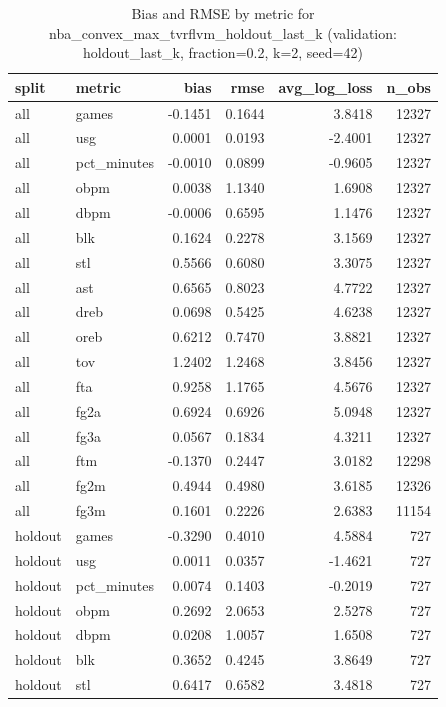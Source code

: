 \begin{table}
\caption{Bias and RMSE by metric for nba_convex_max_tvrflvm_holdout_last_k (validation: holdout_last_k, fraction=0.2, k=2, seed=42)}
\label{tab:nba_convex_max_tvrflvm_holdout_last_k_vs_holdout_last_k_f20_k2_s42_bias_rmse}
\begin{tabular}{llrrrr}
\toprule
split & metric & bias & rmse & avg\_log\_loss & n\_obs \\
\midrule
all & games & -0.1451 & 0.1644 & 3.8418 & 12327 \\
all & usg & 0.0001 & 0.0193 & -2.4001 & 12327 \\
all & pct\_minutes & -0.0010 & 0.0899 & -0.9605 & 12327 \\
all & obpm & 0.0038 & 1.1340 & 1.6908 & 12327 \\
all & dbpm & -0.0006 & 0.6595 & 1.1476 & 12327 \\
all & blk & 0.1624 & 0.2278 & 3.1569 & 12327 \\
all & stl & 0.5566 & 0.6080 & 3.3075 & 12327 \\
all & ast & 0.6565 & 0.8023 & 4.7722 & 12327 \\
all & dreb & 0.0698 & 0.5425 & 4.6238 & 12327 \\
all & oreb & 0.6212 & 0.7470 & 3.8821 & 12327 \\
all & tov & 1.2402 & 1.2468 & 3.8456 & 12327 \\
all & fta & 0.9258 & 1.1765 & 4.5676 & 12327 \\
all & fg2a & 0.6924 & 0.6926 & 5.0948 & 12327 \\
all & fg3a & 0.0567 & 0.1834 & 4.3211 & 12327 \\
all & ftm & -0.1370 & 0.2447 & 3.0182 & 12298 \\
all & fg2m & 0.4944 & 0.4980 & 3.6185 & 12326 \\
all & fg3m & 0.1601 & 0.2226 & 2.6383 & 11154 \\
holdout & games & -0.3290 & 0.4010 & 4.5884 & 727 \\
holdout & usg & 0.0011 & 0.0357 & -1.4621 & 727 \\
holdout & pct\_minutes & 0.0074 & 0.1403 & -0.2019 & 727 \\
holdout & obpm & 0.2692 & 2.0653 & 2.5278 & 727 \\
holdout & dbpm & 0.0208 & 1.0057 & 1.6508 & 727 \\
holdout & blk & 0.3652 & 0.4245 & 3.8649 & 727 \\
holdout & stl & 0.6417 & 0.6582 & 3.4818 & 727 \\

\end{tabular}
\end{table}
